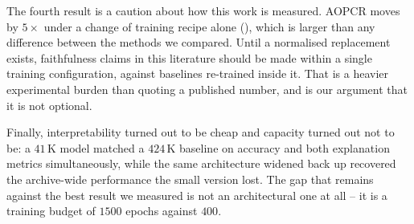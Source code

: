 The fourth result is a caution about how this work is measured. AOPCR moves by $5\times$ under a
change of training recipe alone (), which is larger than any difference between the
methods we compared. Until a normalised replacement exists, faithfulness claims in this literature
should be made within a single training configuration, against baselines re-trained inside it. That
is a heavier experimental burden than quoting a published number, and  is our
argument that it is not optional.

Finally, interpretability turned out to be cheap and capacity turned out not to be: a $41$\,K model
matched a $424$\,K baseline on accuracy and both explanation metrics simultaneously, while the same
architecture widened back up recovered the archive-wide performance the small version lost. The gap
that remains against the best result we measured is not an architectural one at all -- it is a
training budget of $1500$ epochs against $400$.
